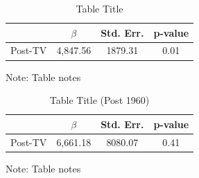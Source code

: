 \noindent 

\begin{table}[H]

\caption{Table Title\label{tab:regression}}

\medskip{}



\begin{centering}

\begin{tabular}{cccc}

\hline 

 & $\beta$ & Std. Err. & p-value\tabularnewline

\hline 

Post-TV & 4,847.56 & 1879.31 & 0.01\tabularnewline

\hline 

\end{tabular}

\par\end{centering}

\begin{centering}

\medskip{}

\par\end{centering}

{\footnotesize{}Note: Table notes}{\footnotesize\par}

\end{table}



\begin{table}[H]

\caption{Table Title (Post 1960)\label{tab:regression_post1960}}

\medskip{}



\begin{centering}

\begin{tabular}{cccc}

\hline 

 & $\beta$ & Std. Err. & p-value\tabularnewline

\hline 

Post-TV & 6,661.18 & 8080.07 & 0.41\tabularnewline

\hline 

\end{tabular}

\par\end{centering}

\begin{centering}

\medskip{}

\par\end{centering}

{\footnotesize{}Note: Table notes}{\footnotesize\par}

\end{table}



